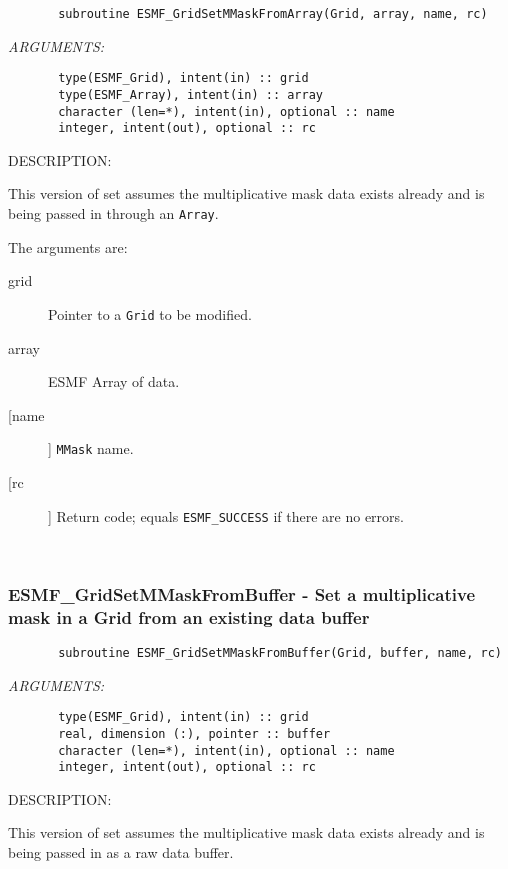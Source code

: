  
\begin{verbatim}       subroutine ESMF_GridSetMMaskFromArray(Grid, array, name, rc)\end{verbatim}{\em ARGUMENTS:}
\begin{verbatim}       type(ESMF_Grid), intent(in) :: grid
       type(ESMF_Array), intent(in) :: array
       character (len=*), intent(in), optional :: name
       integer, intent(out), optional :: rc\end{verbatim}
{\sf DESCRIPTION:\\ }


       This version of set assumes the multiplicative mask data exists already
       and is being passed in through an {\tt Array}.
  
       The arguments are:
       \begin{description}
       \item[grid]
            Pointer to a {\tt Grid} to be modified.
       \item[array]
            ESMF Array of data.
       \item [[name]]
             {\tt MMask} name.
       \item[[rc]]
            Return code; equals {\tt ESMF\_SUCCESS} if there are no errors.
       \end{description}
   
 
\mbox{}\hrulefill\ 
 
\subsubsection{ESMF\_GridSetMMaskFromBuffer - Set a multiplicative mask in a Grid from an existing data buffer}


 
\begin{verbatim}       subroutine ESMF_GridSetMMaskFromBuffer(Grid, buffer, name, rc)\end{verbatim}{\em ARGUMENTS:}
\begin{verbatim}       type(ESMF_Grid), intent(in) :: grid
       real, dimension (:), pointer :: buffer
       character (len=*), intent(in), optional :: name
       integer, intent(out), optional :: rc\end{verbatim}
{\sf DESCRIPTION:\\ }


       This version of set assumes the multiplicative mask data exists already
       and is being passed in as a raw data buffer.
  

